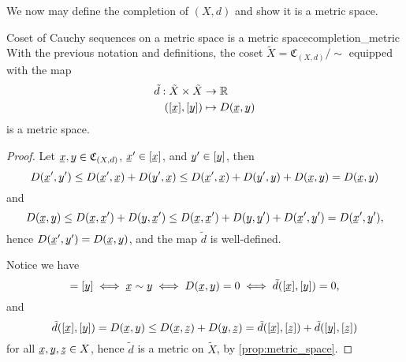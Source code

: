 We now may define the completion of \((X,d)\) and show it is a metric space.
\begin{lemma}{Coset of Cauchy sequences on a metric space is a metric space}{completion_metric}
    With the previous notation and definitions, the coset \(\tilde{X} = \mathfrak{C}_{(X,d)}/{\sim}\) equipped with the map
    \begin{align*}
        \tilde{d} : \tilde{X} \times \tilde{X} &\to \mathbb{R}\\
                                     ([\sequnder{x}],[\sequnder{y}]) &\mapsto D(\sequnder{x},\sequnder{y})
    \end{align*}
    is a metric space.
\end{lemma}
\begin{proof}
    Let \(\sequnder{x}, \sequnder{y} \in \mathfrak{C}_{(X,d)}\), \(\sequnder{x}' \in [\sequnder{x}]\), and \(\sequnder{y}' \in [\sequnder{y}]\), then
    \begin{equation*}
        D(\sequnder{x}',\sequnder{y}') \leq D(\sequnder{x}', \sequnder{x}) + D(\sequnder{y}', \sequnder{x}) \leq D(\sequnder{x}', \sequnder{x}) + D(\sequnder{y}', \sequnder{y}) + D(\sequnder{x}, \sequnder{y}) = D(\sequnder{x},\sequnder{y})
    \end{equation*}
    and 
    \begin{equation*}
        D(\sequnder{x},\sequnder{y}) \leq D(\sequnder{x}, \sequnder{x}') + D(\sequnder{y}, \sequnder{x}') \leq D(\sequnder{x}, \sequnder{x}') + D(\sequnder{y}, \sequnder{y}') + D(\sequnder{x}', \sequnder{y}') = D(\sequnder{x}',\sequnder{y}'),
    \end{equation*}
    hence \(D(\sequnder{x}', \sequnder{y}') = D(\sequnder{x},\sequnder{y})\), and the map \(\tilde{d}\) is well-defined.

    Notice we have
    \begin{equation*}
        [\sequnder{x}] = [\sequnder{y}] \iff \sequnder{x} \sim \sequnder{y} \iff D(\sequnder{x},\sequnder{y}) = 0 \iff \tilde{d}([\sequnder{x}],[\sequnder{y}]) = 0,
    \end{equation*}
    and
    \begin{equation*}
        \tilde{d}([\sequnder{x}],[\sequnder{y}]) = D(\sequnder{x},\sequnder{y}) \leq D(\sequnder{x},\sequnder{z}) + D(\sequnder{y}, \sequnder{z}) = \tilde{d}([\sequnder{x}], [\sequnder{z}]) + \tilde{d}([\sequnder{y}], [\sequnder{z}])
    \end{equation*}
    for all \(\sequnder{x},\sequnder{y},\sequnder{z} \in X\), hence \(\tilde{d}\) is a metric on \(\tilde{X}\), by \cref{prop:metric_space}.
\end{proof}

